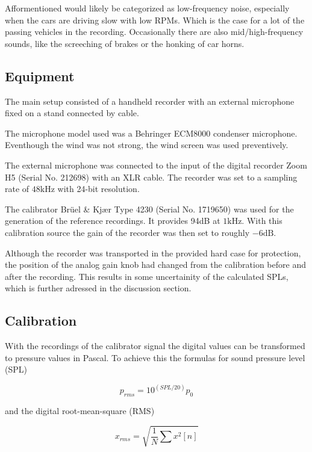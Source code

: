 \documentclass[twocolumn]{article}
\begin{document}
Afformentioned would likely be categorized as low-frequency noise, especially when the cars are driving slow
with low RPMs.
Which is the case for a lot of the passing vehicles in the recording.
Occasionally there are also mid/high-frequency sounds, like the screeching of brakes or the honking of car horns.

\subsection{Equipment}
The main setup consisted of a handheld recorder with an external microphone fixed on a stand connected by cable.

The microphone model used was a Behringer ECM8000 condenser microphone.
Eventhough the wind was not strong, the wind screen was used preventively.

The external microphone was connected to the input of the digital recorder Zoom H5 (Serial No. 212698) with
an XLR cable.
The recorder was set to a sampling rate of $48\textrm{kHz}$ with 24-bit resolution.

The calibrator Brüel \& Kjær Type 4230 (Serial No. 1719650) was used for the generation of the reference recordings.
It provides 94dB at $1\textrm{kHz}$.
With this calibration source the gain of the recorder was then set to roughly $-6\textrm{dB}$.

Although the recorder was transported in the provided hard case for protection, the position of the analog gain
knob had changed from the calibration before and after the recording.
This results in some uncertainity of the calculated SPLs, which is further adressed in the discussion
section.

\subsection{Calibration}
With the recordings of the calibrator signal the digital values can be transformed to pressure
values in Pascal.
To achieve this the formulas for sound pressure level (SPL)

\begin{equation}
    p_{rms} = 10^{\left(SPL/20\right)}p_{0}
\end{equation}

and the digital root-mean-square (RMS)

\begin{equation}
    x_{rms} = \sqrt{\frac{1}{N}\sum x^2\left[n\right]}
\end{equation}
\end{document}
